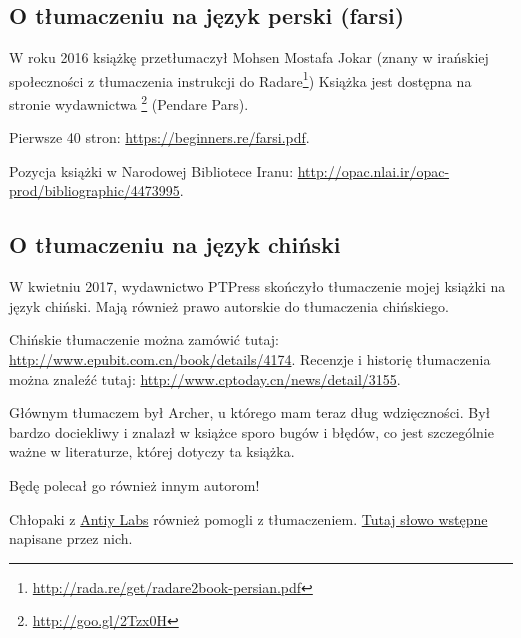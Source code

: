 \subsection*{O tłumaczeniu na język perski (farsi)}

W roku 2016 książkę przetłumaczył Mohsen Mostafa Jokar (znany w irańskiej społeczności z tłumaczenia instrukcji do Radare\footnote{\url{http://rada.re/get/radare2book-persian.pdf}})
Książka jest dostępna na stronie wydawnictwa \footnote{\url{http://goo.gl/2Tzx0H}} (Pendare Pars).

Pierwsze 40 stron: \url{https://beginners.re/farsi.pdf}.

Pozycja książki w Narodowej Bibliotece Iranu: \url{http://opac.nlai.ir/opac-prod/bibliographic/4473995}.

\subsection*{O tłumaczeniu na język chiński}

W kwietniu 2017, wydawnictwo PTPress skończyło tłumaczenie mojej książki na język chiński. Mają również prawo autorskie do tłumaczenia chińskiego.

Chińskie tłumaczenie można zamówić tutaj: \url{http://www.epubit.com.cn/book/details/4174}. Recenzje i historię tłumaczenia można znaleźć tutaj: \url{http://www.cptoday.cn/news/detail/3155}.

Głównym tłumaczem był Archer, u którego mam teraz dług wdzięczności.
Był bardzo dociekliwy i znalazł w książce sporo bugów i błędów, co jest szczególnie ważne w literaturze, której dotyczy ta książka.

Będę polecał go również innym autorom!

Chłopaki z \href{http://www.antiy.net/}{Antiy Labs} również pomogli z tłumaczeniem. \href{http://www.epubit.com.cn/book/onlinechapter/51413}{Tutaj słowo wstępne} napisane przez nich.


